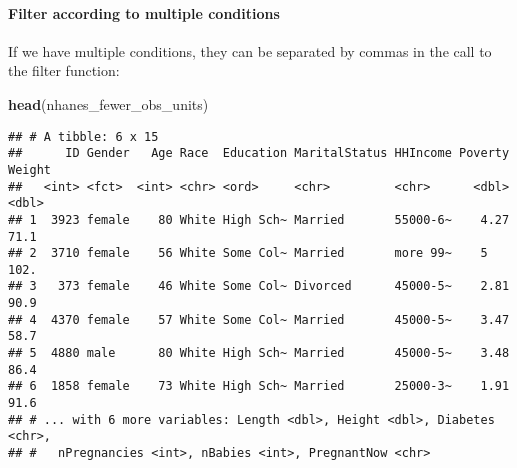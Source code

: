 \documentclass[]{article}
\newenvironment{Shaded}{\begin{snugshade}}{\end{snugshade}}
\newcommand{\KeywordTok}[1]{\textcolor[rgb]{0.13,0.29,0.53}{\textbf{#1}}}
\newcommand{\DecValTok}[1]{\textcolor[rgb]{0.00,0.00,0.81}{#1}}
\newcommand{\StringTok}[1]{\textcolor[rgb]{0.31,0.60,0.02}{#1}}
\newcommand{\OperatorTok}[1]{\textcolor[rgb]{0.81,0.36,0.00}{\textbf{#1}}}
\newcommand{\NormalTok}[1]{#1}
\let\oldparagraph\paragraph
\renewcommand{\paragraph}[1]{\oldparagraph{#1}\mbox{}}
\begin{document}
\begin{Shaded}
\end{Shaded}

\paragraph{Filter according to multiple
conditions}\label{filter-according-to-multiple-conditions}

If we have multiple conditions, they can be separated by commas in the
call to the filter function:

\begin{Shaded}
\end{Shaded}

\begin{Shaded}
\begin{Highlighting}[]
\KeywordTok{head}\NormalTok{(nhanes_fewer_obs_units)}
\end{Highlighting}
\end{Shaded}

\begin{verbatim}
## # A tibble: 6 x 15
##      ID Gender   Age Race  Education MaritalStatus HHIncome Poverty Weight
##   <int> <fct>  <int> <chr> <ord>     <chr>         <chr>      <dbl>  <dbl>
## 1  3923 female    80 White High Sch~ Married       55000-6~    4.27   71.1
## 2  3710 female    56 White Some Col~ Married       more 99~    5     102. 
## 3   373 female    46 White Some Col~ Divorced      45000-5~    2.81   90.9
## 4  4370 female    57 White Some Col~ Married       45000-5~    3.47   58.7
## 5  4880 male      80 White High Sch~ Married       45000-5~    3.48   86.4
## 6  1858 female    73 White High Sch~ Married       25000-3~    1.91   91.6
## # ... with 6 more variables: Length <dbl>, Height <dbl>, Diabetes <chr>,
## #   nPregnancies <int>, nBabies <int>, PregnantNow <chr>
\end{verbatim}
\end{document}
